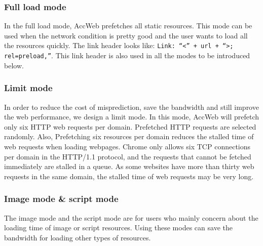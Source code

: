 \subsubsection*{Full load mode}
In the full load mode, AccWeb prefetches all static resources. This mode can be used when the network condition is pretty good and the user wants to load all the resources quickly. The link header looks like:
\texttt{Link: ``<'' + url + ``>; rel=preload,''}.
This link header is also used in all the modes to be introduced below.


\subsubsection*{Limit mode}
In order to reduce the cost of misprediction, save the bandwidth and still improve the web performance, we design a limit mode. In this mode, AccWeb will prefetch only six HTTP web requests per domain. Prefetched HTTP requests are selected randomly. Also, Prefetching six resources per domain reduces the stalled time of web requests when loading webpages. Chrome only allows six TCP connections per domain in the HTTP/1.1 protocol, and the requests that cannot be fetched immediately are stalled in a queue. As some websites have more than thirty web requests in the same domain, the stalled time of web requests may be very long. 

\subsubsection*{Image mode \& script mode}
The image mode and the script mode are for users who mainly concern about the loading time of image or script resources. Using these modes can save the bandwidth for loading other types of resources.
